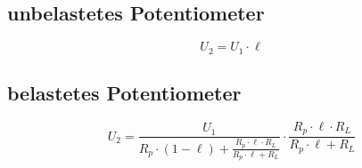 \subsection{unbelastetes Potentiometer}
\[ U_2 = U_1 \cdot \ell \]

\subsection{belastetes Potentiometer}
\[ U_2 = \frac{U_1}{R_p \cdot (1 - \ell) + \frac{R_p \cdot \ell \cdot R_L}{R_p \cdot \ell + R_L}} \cdot \frac{R_p \cdot \ell \cdot R_L}{R_p \cdot \ell + R_L} \]
